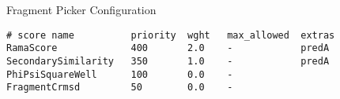 \begin{section}{Fragment Picker Configuration}\label{sec:frag-picker-conf}
\begin{lstlisting}
# score name          priority  wght   max_allowed  extras
RamaScore             400       2.0    -            predA
SecondarySimilarity   350       1.0    -            predA
PhiPsiSquareWell      100       0.0    -
FragmentCrmsd         50        0.0    -
\end{lstlisting}
\end{section}